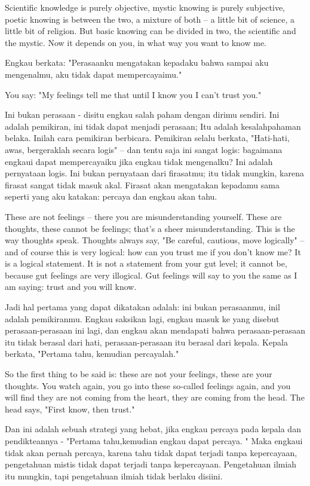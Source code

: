 \english
Scientific knowledge is purely objective, mystic knowing is purely subjective, poetic knowing is between the two, a mixture of both -- a little bit of science, a little bit of religion. But basic knowing can be divided in two, the scientific and the mystic. Now it depends on you, in what way you want to know me.

\bahasa
Engkau berkata: "Perasaanku mengatakan kepadaku bahwa sampai aku mengenalmu, aku tidak dapat mempercayaimu."

\english
You say: "My feelings tell me that until I know you I can't trust you."

\bahasa
Ini bukan perasaan - disitu engkau salah paham dengan dirimu sendiri. Ini adalah pemikiran, ini tidak dapat menjadi perasaan; Itu adalah kesalahpahaman belaka. Inilah cara pemikiran berbicara. Pemikiran selalu berkata, "Hati-hati, awas, bergeraklah secara logis" -- dan tentu saja ini sangat logis: bagaimana engkaui dapat mempercayaiku jika engkau tidak mengenalku? Ini adalah pernyataan logis. Ini bukan pernyataan dari firasatmu; itu tidak mungkin, karena firasat sangat tidak masuk akal. Firasat akan mengatakan kepadamu sama seperti yang aku katakan: percaya dan engkau akan tahu.

\english
These are not feelings -- there you are misunderstanding yourself. These are thoughts, these cannot be feelings; that's a sheer misunderstanding. This is the way thoughts speak. Thoughts always say, "Be careful, cautious, move logically" -- and of course this is very logical: how can you trust me if you don't know me? It is a logical statement. It is not a statement from your gut level; it cannot be, because gut feelings are very illogical. Gut feelings will say to you the same as I am saying: trust and you will know.

\bahasa
Jadi hal pertama yang dapat dikatakan adalah: ini bukan perasaanmu, inil adalah pemikiranmu. Engkau saksikan lagi, engkau masuk ke yang disebut perasaan-perasaan ini lagi, dan engkau akan mendapati bahwa perasaan-perasaan itu tidak berasal dari hati, perasaan-perasaan itu berasal dari kepala. Kepala berkata, "Pertama tahu, kemudian percayalah."

\english
So the first thing to be said is: these are not your feelings, these are your thoughts. You watch again, you go into these so-called feelings again, and you will find they are not coming from the heart, they are coming from the head. The head says, "First know, then trust."

\bahasa
Dan ini adalah sebuah strategi yang hebat, jika engkau percaya pada kepala dan pendikteannya - "Pertama tahu,kemudian engkau dapat percaya. " Maka engkaui tidak akan pernah percaya, karena tahu tidak dapat terjadi tanpa kepercayaan, pengetahuan mistis tidak dapat terjadi tanpa kepercayaan. Pengetahuan ilmiah itu mungkin, tapi pengetahuan ilmiah tidak berlaku disiini.

